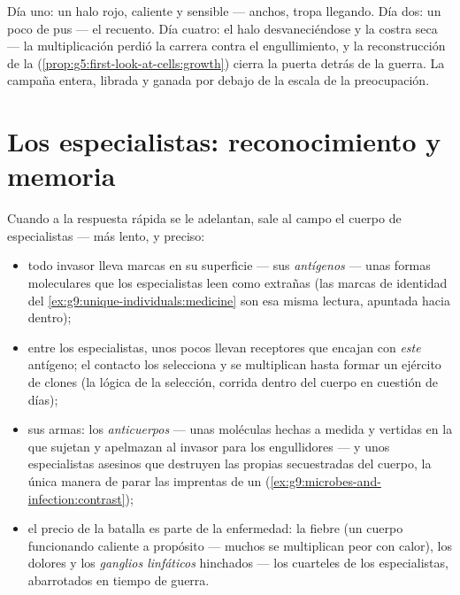 \begin{example}\label{ex:g9:immune-defenses:cut}
Día uno: un halo rojo, caliente y sensible ---  anchos, tropa
llegando. Día dos: un poco de pus --- el recuento. Día cuatro: el halo
desvaneciéndose y la costra seca --- la multiplicación perdió la
carrera contra el engullimiento, y la reconstrucción de la 
(\cref{prop:g5:first-look-at-cells:growth}) cierra la puerta detrás de
la guerra. La campaña entera, librada y ganada por debajo de la escala
de la preocupación.
\end{example}

\section{Los especialistas: reconocimiento y memoria}

\begin{proposition}\label{prop:g9:immune-defenses:specific}
Cuando a la respuesta rápida se le adelantan, sale al campo el cuerpo
de especialistas --- más lento, y preciso:
\begin{itemize}
  \item todo invasor lleva marcas en su superficie --- sus
        \emph{antígenos} --- unas formas moleculares
        que los especialistas leen como extrañas (las marcas de
        identidad del \cref{ex:g9:unique-individuals:medicine} son esa
        misma lectura, apuntada hacia dentro);
  \item entre los  especialistas, unos pocos llevan
        receptores que encajan con \emph{este} antígeno; el contacto
        los selecciona y se multiplican hasta formar un ejército de
        clones (la lógica de la selección, corrida dentro del cuerpo en
        cuestión de días);
  \item sus armas: los \emph{anticuerpos} --- unas
        moléculas hechas a medida y vertidas en la  que sujetan y
        apelmazan al invasor para los engullidores --- y unos
        especialistas asesinos que destruyen las propias 
        secuestradas del cuerpo, la única manera de parar las imprentas
        de un  (\cref{ex:g9:microbes-and-infection:contrast});
  \item el precio de la batalla es parte de la enfermedad: la fiebre
        (un cuerpo funcionando caliente a propósito --- muchos
         se multiplican peor con calor), los dolores y los
        \emph{ganglios linfáticos} hinchados --- los cuarteles de los
        especialistas, abarrotados en tiempo de guerra.
\end{itemize}
\end{proposition}
\admitted

